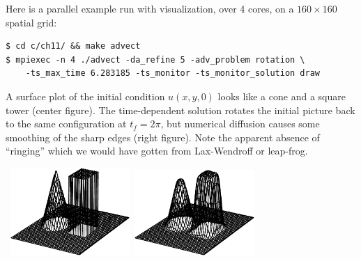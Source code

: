 \documentclass[11pt]{amsart}
\begin{document}
Here is a parallel example run with visualization, over 4 cores, on a $160\times 160$ spatial grid:

\medskip
\begin{Verbatim}[fontsize=\small]
$ cd c/ch11/ && make advect
$ mpiexec -n 4 ./advect -da_refine 5 -adv_problem rotation \
    -ts_max_time 6.283185 -ts_monitor -ts_monitor_solution draw
\end{Verbatim}

\medskip
A surface plot of the initial condition $u(x,y,0)$ looks like a cone and a square tower (center figure).  The time-dependent solution rotates the initial picture back to the same configuration at $t_f = 2\pi$, but numerical diffusion causes some smoothing of the sharp edges (right figure).  Note the apparent absence of ``ringing'' which we would have gotten from Lax-Wendroff or leap-frog.

\bigskip\medskip
\noindent\mbox{ \qquad \includegraphics[width=0.34\textwidth]{figs/rotationinitial.pdf} \quad \includegraphics[width=0.34\textwidth]{figs/rotationfinal.pdf}}
\end{document}
